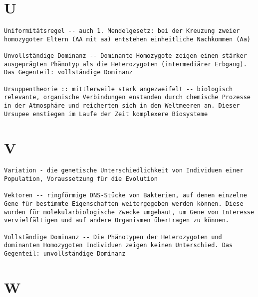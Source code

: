 \documentclass{article}
\begin{document}
\section{U}
\begin{verbatim}
Uniformitätsregel -- auch 1. Mendelgesetz: bei der Kreuzung zweier homozygoter Eltern (AA mit aa) entstehen einheitliche Nachkommen (Aa)

Unvollständige Dominanz -- Dominante Homozygote zeigen einen stärker ausgeprägten Phänotyp als die Heterozygoten (intermediärer Erbgang). Das Gegenteil: vollständige Dominanz

Ursuppentheorie :: mittlerweile stark angezweifelt -- biologisch relevante, organische Verbindungen enstanden durch chemische Prozesse in der Atmosphäre und reicherten sich in den Weltmeeren an. Dieser Ursupee enstiegen im Laufe der Zeit komplexere Biosysteme

\end{verbatim}
\newpage


\section{V}
\begin{verbatim}
Variation - die genetische Unterschiedlichkeit von Individuen einer Population, Voraussetzung für die Evolution

Vektoren -- ringförmige DNS-Stücke von Bakterien, auf denen einzelne Gene für bestimmte Eigenschaften weitergegeben werden können. Diese wurden für molekularbiologische Zwecke umgebaut, um Gene von Interesse vervielfältigen und auf andere Organismen übertragen zu können.

Vollständige Dominanz -- Die Phänotypen der Heterozygoten und dominanten Homozygoten Individuen zeigen keinen Unterschied. Das Gegenteil: unvollständige Dominanz

\end{verbatim}
\newpage


\section{W}
\begin{verbatim}

\end{verbatim}
\newpage
\end{document}
